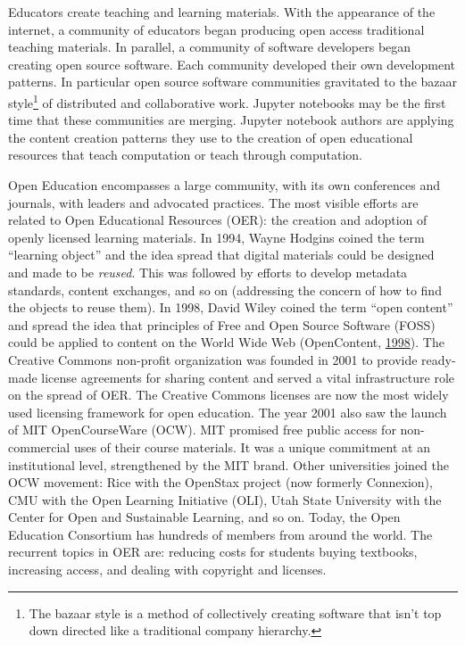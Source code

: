 \documentclass[]{book}
\let\rmarkdownfootnote\footnote%
\def\footnote{\protect\rmarkdownfootnote}
\begin{document}
Educators create teaching and learning materials. With the appearance of
the internet, a community of educators began producing open access
traditional teaching materials. In parallel, a community of software
developers began creating open source software. Each community developed
their own development patterns. In particular open source software
communities gravitated to the bazaar style\footnote{The bazaar style is
  a method of collectively creating software that isn't top down
  directed like a traditional company hierarchy.} of distributed and
collaborative work. Jupyter notebooks may be the first time that these
communities are merging. Jupyter notebook authors are applying the
content creation patterns they use to the creation of open educational
resources that teach computation or teach through computation.

Open Education encompasses a large community, with its own conferences
and journals, with leaders and advocated practices. The most visible
efforts are related to Open Educational Resources (OER): the creation
and adoption of openly licensed learning materials. In 1994, Wayne
Hodgins coined the term ``learning object'' and the idea spread that
digital materials could be designed and made to be \emph{reused}. This
was followed by efforts to develop metadata standards, content
exchanges, and so on (addressing the concern of how to find the objects
to reuse them). In 1998, David Wiley coined the term ``open content''
and spread the idea that principles of Free and Open Source Software
(FOSS) could be applied to content on the World Wide Web (OpenContent,
\protect\hyperlink{ref-OC1998}{1998}). The Creative Commons non-profit
organization was founded in 2001 to provide ready-made license
agreements for sharing content and served a vital infrastructure role on
the spread of OER. The Creative Commons licenses are now the most widely
used licensing framework for open education. The year 2001 also saw the
launch of MIT OpenCourseWare (OCW). MIT promised free public access for
non-commercial uses of their course materials. It was a unique
commitment at an institutional level, strengthened by the MIT brand.
Other universities joined the OCW movement: Rice with the OpenStax
project (now formerly Connexion), CMU with the Open Learning Initiative
(OLI), Utah State University with the Center for Open and Sustainable
Learning, and so on. Today, the Open Education Consortium has hundreds
of members from around the world. The recurrent topics in OER are:
reducing costs for students buying textbooks, increasing access, and
dealing with copyright and licenses.
\end{document}

